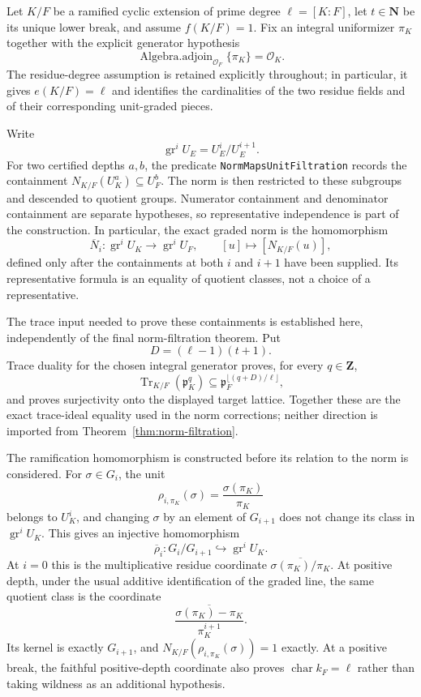 \begin{theorem}
\label{mod:ramification-normbelowbreak}
Let $K/F$ be a ramified cyclic extension of prime degree
$\ell=[K:F]$, let $t\in\mathbf N$ be its unique lower break, and assume
$f(K/F)=1$.  Fix an integral uniformizer $\pi_K$ together with the
explicit generator hypothesis
\[
 \operatorname{Algebra.adjoin}_{\mathcal O_F}\{\pi_K\}=\mathcal O_K.
\]
The residue-degree assumption is retained explicitly throughout; in
particular, it gives $e(K/F)=\ell$ and identifies the cardinalities of the
two residue fields and of their corresponding unit-graded pieces.

Write
\[
 \operatorname{gr}^iU_E=U_E^i/U_E^{i+1}.
\]
For two certified depths $a,b$, the predicate
\texttt{NormMapsUnitFiltration} records the containment
$N_{K/F}(U_K^a)\subseteq U_F^b$.  The norm is then restricted to these
subgroups and descended to quotient groups.  Numerator containment and
denominator containment are separate hypotheses, so representative
independence is part of the construction.  In particular, the exact graded
norm is the homomorphism
\[
 \overline N_i:\operatorname{gr}^iU_K\longrightarrow
                 \operatorname{gr}^iU_F,
 \qquad [u]\longmapsto[N_{K/F}(u)],
\]
defined only after the containments at both $i$ and $i+1$ have been
supplied.  Its representative formula is an equality of quotient classes,
not a choice of a representative.

The trace input needed to prove these containments is established here,
independently of the final norm-filtration theorem.  Put
\[
 D=(\ell-1)(t+1).
\]
Trace duality for the chosen integral generator proves, for every
$q\in\mathbf Z$,
\[
 \operatorname{Tr}_{K/F}(\mathfrak p_K^q)
 \subseteq
 \mathfrak p_F^{\lfloor(q+D)/\ell\rfloor},
\]
and proves surjectivity onto the displayed target lattice.  Together these
are the exact trace-ideal equality used in the norm corrections; neither
direction is imported from Theorem~\ref{thm:norm-filtration}.

The ramification homomorphism is constructed before its relation to the
norm is considered.  For $\sigma\in G_i$, the unit
\[
 \rho_{i,\pi_K}(\sigma)=\frac{\sigma(\pi_K)}{\pi_K}
\]
belongs to $U_K^i$, and changing $\sigma$ by an element of $G_{i+1}$
does not change its class in $\operatorname{gr}^iU_K$.  This gives an
injective homomorphism
\[
 \overline\rho_i:G_i/G_{i+1}\hookrightarrow
                  \operatorname{gr}^iU_K.
\]
At $i=0$ this is the multiplicative residue coordinate
$\overline{\sigma(\pi_K)/\pi_K}$.  At positive depth, under the usual
additive identification of the graded line, the same quotient class is
the coordinate
\[
 \overline{\frac{\sigma(\pi_K)-\pi_K}{\pi_K^{i+1}}}.
\]
Its kernel is exactly $G_{i+1}$, and
$N_{K/F}(\rho_{i,\pi_K}(\sigma))=1$ exactly.  At a positive break, the
faithful positive-depth coordinate also proves
$\operatorname{char}k_F=\ell$ rather than taking wildness as an additional
hypothesis.


\end{theorem}
